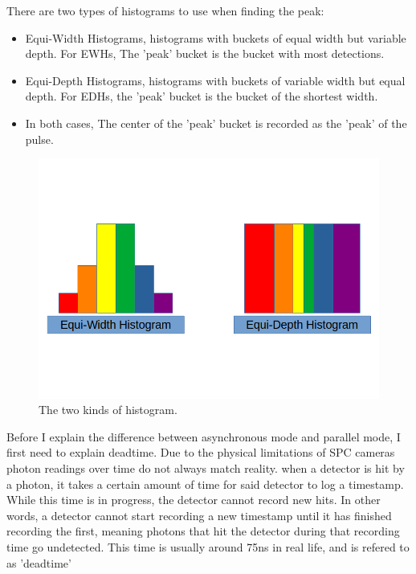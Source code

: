 \documentclass{beamer}
\begin{document}
\begin{frame}  
  There are two types of histograms to use when finding the peak: \cite{sadekar}
  \begin{itemize}
  \item Equi-Width Histograms, histograms with buckets of equal width but variable depth. For EWHs, The 'peak' bucket is the bucket with most detections.
  \item Equi-Depth Histograms, histograms with buckets of variable width but equal depth. For EDHs, the 'peak' bucket is the bucket of the shortest width.
  \item In both cases, The center of the 'peak' bucket is recorded as the 'peak' of the pulse.
  \end{itemize}
\end{frame}

\begin{frame}
  \begin{figure}[H]
    \centering
    \includegraphics[width=1\linewidth]{Histograms.png}
    \caption{\label{fig:Data}The two kinds of histogram.}
  \end{figure}
\end{frame}

\begin{frame}
  Before I explain the difference between asynchronous mode and parallel mode, I first need to explain deadtime.
  Due to the physical limitations of SPC cameras photon readings over time do not always match reality. when a detector is hit by a photon, it takes a certain amount of time for said detector to log a timestamp. While this time is in progress, the detector cannot record new hits. In other words, a detector cannot start recording a new timestamp until it has finished recording the first, meaning photons that hit the detector during that recording time go undetected. This time is usually around 75ns in real life, and is refered to as 'deadtime' \cite{sadekar}
\end{frame}
\end{document}
